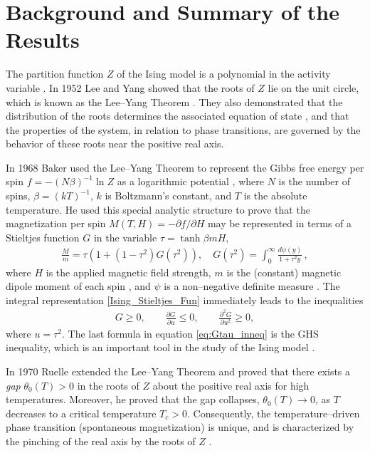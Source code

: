 \documentclass[english,12pt,jmp,graphicx]{revtex4-1}
\begin{document}
\section{Background and Summary of the Results}\label{sec:Background}
%
The partition function $Z$ of the Ising model is a polynomial
in the activity variable \cite{Lee:PR:411,Baker-1990,Ruelle-1969,Ruelle:AM:589}.
In 1952 Lee and Yang \cite{Lee:PR:411} showed that the 
roots of $Z$ lie on the unit circle, which is
known as the Lee--Yang Theorem \cite{Lee:PR:411,Ruelle-1969}.
They also demonstrated that 
the distribution of the roots determines 
the associated equation of state
\cite{Yang:PR:404}, and that the properties of 
the system, in relation to phase transitions, are governed by the
behavior of these roots near the positive real axis.   

In 1968 Baker \cite{Baker:PRL-990} used the Lee--Yang Theorem to represent the Gibbs
free energy per spin $f=-(N\beta)^{-1}\ln{Z}$ as a logarithmic potential
\cite{Saff_Totik:97}, where $N$ is the number of spins, $\beta=(kT)^{-1}$,
$k$ is Boltzmann's constant, and $T$ is the absolute temperature.
He used this special analytic structure to prove
that the magnetization per spin $M(T,H)=-\partial f/\partial H$
\cite{Robertson-1993} may be represented in terms of a Stieltjes
function $G$ in the variable $\tau=\tanh{\beta mH}$,          
%
\begin{align}\label{Ising_Stieltjes_Fun}
  \frac{M}{m} =\tau(1+(1-\tau^2)G(\tau^2)), \quad
  G(\tau^2)=\int_0^\infty\frac{d\psi(y)}{1+\tau^2y}\,, %
\end{align}
%
where $H$ is the applied magnetic field strength, $m$ is the
(constant) magnetic dipole moment of each spin \cite{Griffiths-1999},
and $\psi$ is a non--negative definite measure \cite{Baker:PRL-990,Baker-1990}. The
integral representation \eqref{Ising_Stieltjes_Fun} immediately leads
to the inequalities    
%
\begin{align}\label{eq:Gtau_inneq}
  G\geq0, \qquad \frac{\partial G}{\partial u}\leq0, \qquad \frac{\partial^2G}{\partial u^2}\geq0,
\end{align}
%
where $u=\tau^2$. The last formula in equation \eqref{eq:Gtau_inneq} is
the GHS inequality, which is an important tool in the study of the
Ising model \cite{Golden:JMP-5627}. 

In 1970 Ruelle  \cite{Ruelle:PRL:303} extended the Lee--Yang Theorem and proved that
there exists a \emph{gap} $\theta_0(T)>0$ in the roots of $Z$ about the positive
real axis for high temperatures. Moreover, he
proved that the gap collapses, $\theta_0(T)\to0$, as $T$ decreases to a
critical temperature $T_c>0$. Consequently, the temperature--driven
phase transition (spontaneous magnetization) is unique, and is
characterized by the pinching of the real axis by the roots of $Z$
\cite{Ruelle-1969}.   
\end{document}

